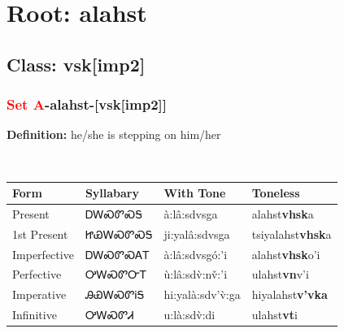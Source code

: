 \needspace{4in}
\section*{Root: alahst}
\nopagebreak
{}
\needspace{3in}
\subsection*{Class: vsk[imp2]}
\nopagebreak
\needspace{2in}
\subsubsection*{\textcolor{Red}{Set A}{-}\textbf{alahst}{-}[vsk[imp2]]}
\nopagebreak
\textbf{Definition: } he/she is stepping on him/her
\\[0.5em]
\begin{tabularx}{\textwidth}{l X X X}%
\toprule%
\textbf{Form}&\textbf{Syllabary}&\textbf{With Tone}&\textbf{Toneless}\\%
\midrule%
Present&ᎠᎳᏍᏛᏍᎦ&à:lâ:sdvsga&alahst\textbf{vhsk}a\\%
1st Present&ᏥᏯᎳᏍᏛᏍᎦ&ji:yalâ:sdvsga&tsiyalahst\textbf{vhsk}a\\%
Imperfective&ᎠᎳᏍᏛᏍᎪᎢ&à:lâ:sdvsgó:’i&alahst\textbf{vhsk}o'i\\%
Perfective&ᎤᎳᏍᏛᏅᎢ&ù:lâ:sdv̀:nv̌:’i&ulahst\textbf{vn}v'i\\%
Imperative&ᎯᏯᎳᏍᏛᎥᎦ&hi:yalà:sdv’v̀:ga&hiyalahst\textbf{v'vka}\\%
Infinitive&ᎤᎳᏍᏛᏗ&u:là:sdv̀:di&ulahst\textbf{vt}i\\%
\bottomrule%
\end{tabularx}
\\[1em]